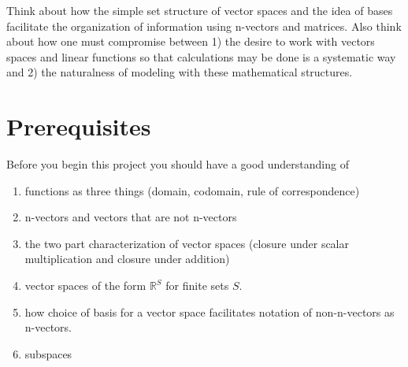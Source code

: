 \documentclass[12pt]{article}
\begin{document}
Think about how the simple set structure of vector spaces and the idea of bases facilitate the organization of information using n-vectors and matrices. 
Also think about how one must compromise between 1) the desire to work with vectors spaces and linear functions so that calculations may be done is a systematic way and 2) the naturalness of modeling with these mathematical structures. 


\newpage

\section{Prerequisites}
Before you begin this project you should have a good understanding of 
\begin{enumerate}
\item functions as three things (domain, codomain, rule of correspondence) 
\item n-vectors and vectors that are not n-vectors
\item the two part characterization of vector spaces (closure under scalar multiplication and closure under addition)
\item vector spaces of the form $\mathbb{R}^S$ for finite sets $S$.
\item how choice of basis for a vector space facilitates notation of non-n-vectors as n-vectors. 
\item subspaces 
\end{enumerate}






%
%




\newpage
\end{document}
